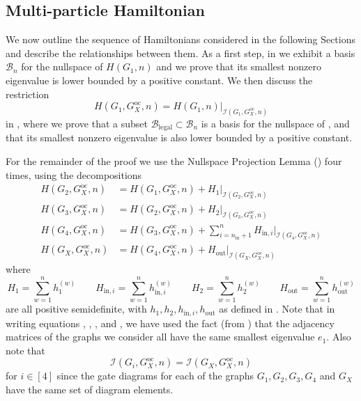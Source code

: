 \documentclass[../thesis-main/thesis-main]{subfiles}
\begin{document}
\subsection{Multi-particle Hamiltonian}
\label{sec:Building-up-the}

We now outline the sequence of Hamiltonians considered in the following Sections and describe the relationships between them. As a first step, in  we exhibit a basis $\mathcal{B}_{n}$ for the nullspace of $H(G_{1},n)$ and we prove that its smallest nonzero eigenvalue is lower bounded by a positive constant. We then discuss the restriction
\begin{equation}
  H(G_{1},G_X^{\text{oc}},n)
  = H(G_{1},n)\big|_{\mathcal{I}\left(G_{1},G_X^{\text{oc}},n\right)}
\label{eq:restriction}
\end{equation}
in , where we prove that a subset $\mathcal{B}_{\text{legal}}\subset\mathcal{B}_{n}$ is a basis for the nullspace of , and that its smallest nonzero eigenvalue is also lower bounded by a positive constant.

For the remainder of the proof we use the Nullspace Projection Lemma () four times, using the decompositions 
\begin{align}
H(G_{2},G_X^{\text{oc}},n) & =H(G_{1},G_X^{\text{oc}},n)+H_{1}\big|_{\mathcal{I}(G_{2},G_X^{\text{oc}},n)}\label{eq:H_G2}\\
H(G_{3},G_X^{\text{oc}},n) & =H(G_{2},G_X^{\text{oc}},n)+H_{2}\big|_{\mathcal{I}(G_{3},G_X^{\text{oc}},n)}\label{eq:H_G3}\\
H(G_{4},G_X^{\text{oc}},n) & =H(G_{3},G_X^{\text{oc}},n)+\sum_{i=n_{\text{in}}+1}^{n}H_{\text{in},i}\big|_{\mathcal{I}(G_{4},G_X^{\text{oc}},n)}\label{eq:H_G4}\\
H(G_X,G_X^{\text{oc}},n) & =H(G_{4},G_X^{\text{oc}},n)+H_{\text{out}}\big|_{\mathcal{I}(G_X,G_X^{\text{oc}},n)}\label{eq:H_GC}
\end{align}
where 
\begin{equation*}
H_{1}=\sum_{w=1}^{n}h_{1}^{(w)} \qquad H_{\text{in},i}=\sum_{w=1}^{n}h_{\text{in},i}^{(w)} \qquad 
H_{2}=\sum_{w=1}^{n}h_{2}^{(w)} \qquad  H_{\text{out}}=\sum_{w=1}^{n}h_{\text{out}}^{(w)}
\end{equation*}
are all positive semidefinite, with $h_{1},h_{2},h_{\text{in},i},h_{\text{out}}$ as defined in . Note that in writing equations , , , and , we have used the fact (from ) that the adjacency matrices of the graphs we consider all have the same smallest eigenvalue $e_{1}$. Also note that
\begin{equation} \mathcal{\mathcal{I}}\left(G_{i},G_X^{\text{oc}},n\right)=\mathcal{\mathcal{I}}\left(G_X,G_X^{\text{oc}},n\right) \end{equation} for $i\in[4]$ since the gate diagrams for each of the graphs $G_{1},G_{2},G_{3},G_{4}$ and $G_X$ have the same set of diagram elements.
\end{document}
